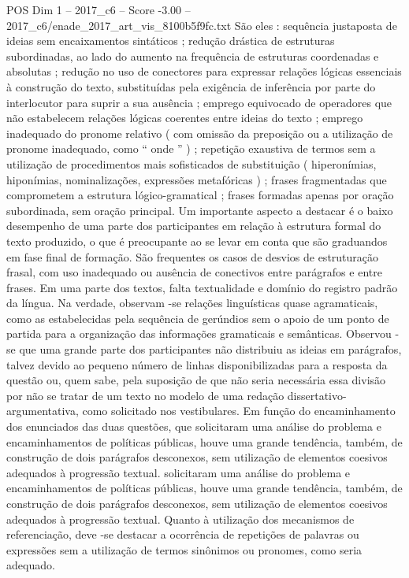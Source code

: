 \begin{textsample}{POS Dim 1 – 2017\_c6 – Score -3.00 – 2017\_c6/enade\_2017\_art\_vis\_8100b5f9fc.txt}
São eles : sequência justaposta de ideias sem encaixamentos sintáticos ; redução drástica de estruturas subordinadas, ao lado do aumento na frequência de estruturas coordenadas e absolutas ; redução no uso de conectores para expressar relações lógicas essenciais à construção do texto, substituídas pela exigência de inferência por parte do interlocutor para suprir a sua ausência ; emprego equivocado de operadores que não estabelecem relações lógicas coerentes entre ideias do texto ; emprego inadequado do pronome relativo ( com omissão da preposição ou a utilização de pronome inadequado, como “ onde ” ) ; repetição exaustiva de termos sem a utilização de procedimentos mais sofisticados de substituição ( hiperonímias, hiponímias, nominalizações, expressões metafóricas ) ; frases fragmentadas que comprometem a estrutura lógico-gramatical ; frases formadas apenas por oração subordinada, sem oração principal.
Um importante aspecto a destacar é o baixo desempenho de uma parte dos participantes em relação à estrutura formal do texto produzido, o que é preocupante ao se levar em conta que são graduandos em fase final de formação.
São frequentes os casos de desvios de estruturação frasal, com uso inadequado ou ausência de conectivos entre parágrafos e entre frases.
Em uma parte dos textos, falta textualidade e domínio do registro padrão da língua.
Na verdade, observam -se relações linguísticas quase agramaticais, como as estabelecidas pela sequência de gerúndios sem o apoio de um ponto de partida para a organização das informações gramaticais e semânticas.
Observou -se que uma grande parte dos participantes não distribuiu as ideias em parágrafos, talvez devido ao pequeno número de linhas disponibilizadas para a resposta da questão ou, quem sabe, pela suposição de que não seria necessária essa divisão por não se tratar de um texto no modelo de uma redação dissertativo-argumentativa, como solicitado nos vestibulares.
Em função do encaminhamento dos enunciados das duas questões, que solicitaram uma análise do problema e encaminhamentos de políticas públicas, houve uma grande tendência, também, de construção de dois parágrafos desconexos, sem utilização de elementos coesivos adequados à progressão textual. solicitaram uma análise do problema e encaminhamentos de políticas públicas, houve uma grande tendência, também, de construção de dois parágrafos desconexos, sem utilização de elementos coesivos adequados à progressão textual.
Quanto à utilização dos mecanismos de referenciação, deve -se destacar a ocorrência de repetições de palavras ou expressões sem a utilização de termos sinônimos ou pronomes, como seria adequado.

\end{textsample}
